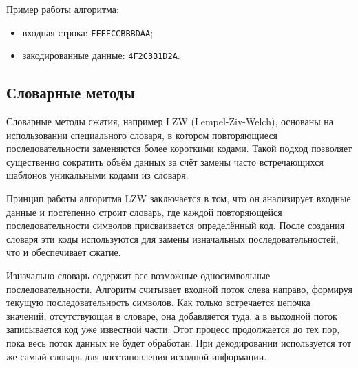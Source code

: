 Пример работы алгоритма:
\begin{itemize}
    \item входная строка: \texttt{FFFFCCBBBDAA};
    \item закодированные данные: \texttt{4F2C3B1D2A}.
\end{itemize}

\subsection{Словарные методы}

Словарные методы сжатия, например LZW (Lempel-Ziv-Welch), основаны на использовании специального словаря, в котором повторяющиеся последовательности заменяются более короткими кодами. Такой подход позволяет существенно сократить объём данных за счёт замены часто встречающихся шаблонов уникальными кодами из словаря.

Принцип работы алгоритма LZW заключается в том, что он анализирует входные данные и постепенно строит словарь, где каждой повторяющейся последовательности символов присваивается определённый код. После создания словаря эти коды используются для замены изначальных последовательностей, что и обеспечивает сжатие.

Изначально словарь содержит все возможные односимвольные последовательности. Алгоритм считывает входной поток слева направо, формируя текущую последовательность символов. Как только встречается цепочка значений, отсутствующая в словаре, она добавляется туда, а в выходной поток записывается код уже известной части. Этот процесс продолжается до тех пор, пока весь поток данных не будет обработан. При декодировании используется тот же самый словарь для восстановления исходной информации.

